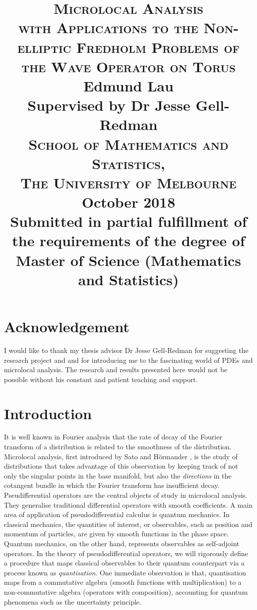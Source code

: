 \documentclass[12pt, twoside]{book}
\title{    
    \textsc{\LARGE \textbf{Microlocal Analysis}} \\
    \textsc{\large \textbf{with Applications to the Non-elliptic Fredholm Problems of the Wave Operator on Torus}} \\ [5em]
    Edmund Lau \\
    Supervised by Dr Jesse Gell-Redman \\ [5em] 
    \textsc{\Large School of Mathematics and Statistics, \\ The University of Melbourne} \\ [5em]
    {\large October 2018} \\
    {\large Submitted in partial fulfillment of the requirements of the degree of Master of Science (Mathematics and Statistics) } \\
}
\date{}
\begin{document}
\maketitle



\chapter*{Acknowledgement}
I would like to thank my thesis advisor Dr Jesse Gell-Redman for suggesting the research project and and for introducing me to the fascinating world of PDEs and microlocal analysis. The research and results presented here would not be possible without his constant and patient teaching and support. 


\tableofcontents

\chapter{Introduction}

It is well known in Fourier analysis that the rate of decay of the Fourier transform of a distribution is related to the smoothness of the distribution. Microlocal analysis, first introduced by  Sato \cite{Sato1970-on} and H\"ormander \cite{Hormander2007-ws}, is the study of distributions that takes advantage of this observation by keeping track of not only the singular points in the base manifold, but also the \textit{directions} in the cotangent bundle in which the Fourier transform has insufficient decay. \\

Pseudifferential operators are the central objects of study in microlocal analysis. They generalise traditional differential operators with smooth coefficients. A main area of application of pseudodifferential calculus is quantum mechanics\cite{Martinez2002-xg}. In classical  mechanics,  the quantities of interest, or  observables,  such as position and momentum of particles, are given by smooth functions in the phase space. Quantum mechanics, on the other hand, represents observables as self-adjoint operators. In the theory of pseudodifferential operators, we will rigorously define a procedure that maps classical observables to their quantum counterpart via a process known as \textit{quantisation}. One immediate observation is that, quantisation maps from a commutative algebra (smooth functions with multiplication) to a non-commutative algebra (operators with composition), accounting for quantum phenomena such as the uncertainty principle. \\
\end{document}
